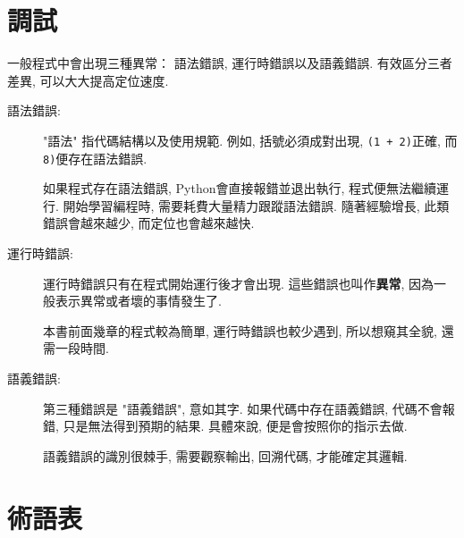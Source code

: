 \documentclass[10pt]{book}
\begin{document}
\section{調試}

一般程式中會出現三種異常：
語法錯誤, 運行時錯誤以及語義錯誤. 
有效區分三者差異, 可以大大提高定位速度. 

\begin{description}

\item[語法錯誤:] "語法" 指代碼結構以及使用規範. 
例如, 括號必須成對出現, 
{\tt (1 + 2)}正確, 而{\tt 8)}便存在語法錯誤. 

如果程式存在語法錯誤, Python會直接報錯並退出執行, 
程式便無法繼續運行. 
開始學習編程時, 需要耗費大量精力跟蹤語法錯誤. 
隨著經驗增長, 此類錯誤會越來越少, 而定位也會越來越快. 


\item[運行時錯誤:] 運行時錯誤只有在程式開始運行後才會出現. 
這些錯誤也叫作{\bf 異常}, 因為一般表示異常或者壞的事情發生了. 
 
    

本書前面幾章的程式較為簡單, 運行時錯誤也較少遇到, 
所以想窺其全貌, 還需一段時間. 

\item[語義錯誤:] 第三種錯誤是 "語義錯誤", 意如其字. 
如果代碼中存在語義錯誤, 代碼不會報錯, 只是無法得到預期的結果. 
具體來說, 便是會按照你的指示去做. 
   

語義錯誤的識別很棘手, 需要觀察輸出, 回溯代碼, 才能確定其邏輯. 

\end{description}


\section{術語表}
\end{document}
